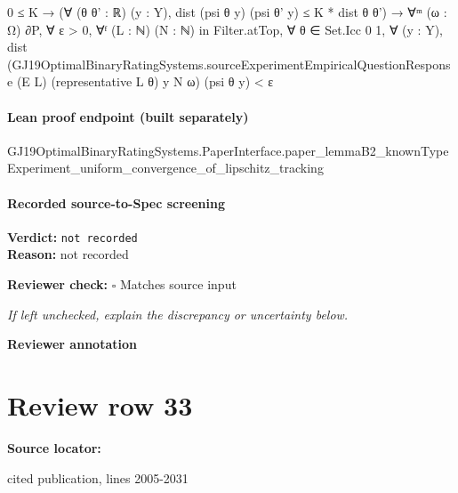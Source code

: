 \documentclass[10pt]{article}
\newcommand{\reviewerbox}{%
  \par\noindent\fbox{\parbox{0.96\linewidth}{\rule{0pt}{0.38in}}}\par
}
\newcommand{\reviewmatch}[1]{%
  \par\noindent\textbf{Reviewer check:} $\square$\; #1\par
  \noindent\emph{If left unchecked, explain the discrepancy or uncertainty below.}\par
}
\begin{document}
\begin{ReviewVerbatim}
                        0 ≤ K →
                          (∀ (θ θ' : ℝ) (y : Y), dist (psi θ y) (psi θ' y) ≤ K * dist θ θ') →
                            ∀ᵐ (ω : Ω) ∂P,
                              ∀ ε > 0,
                                ∀ᶠ (L : ℕ) (N : ℕ) in Filter.atTop,
                                  ∀ θ ∈ Set.Icc 0 1,
                                    ∀ (y : Y),
                                      dist
                                          (GJ19OptimalBinaryRatingSystems.sourceExperimentEmpiricalQuestionResponse
                                            (E L) (representative L θ) y N ω)
                                          (psi θ y) <
                                        ε
\end{ReviewVerbatim}

\paragraph{Lean proof endpoint (built separately)}\begin{ReviewVerbatim}
GJ19OptimalBinaryRatingSystems.PaperInterface.paper_lemmaB2_knownTypeExperiment_uniform_convergence_of_lipschitz_tracking
\end{ReviewVerbatim}

\paragraph{Recorded source-to-Spec screening}
\textbf{Verdict:} \texttt{not recorded}
\\
\textbf{Reason:} not recorded
\reviewmatch{Matches source input}
\noindent\textbf{Reviewer annotation}\par
\reviewerbox
\clearpage
\hypertarget{source-claim-76b42fc11ca5198e}{}
\section*{Review row 33}
\textbf{Source locator:} {\footnotesize\raggedright cited publication, lines 2005-\allowbreak{}2031\par}
\end{document}
